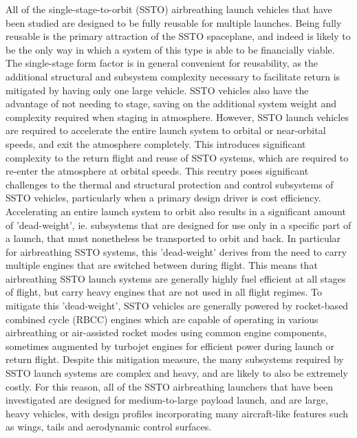 All of the single-stage-to-orbit (SSTO) airbreathing launch vehicles that have been studied are designed to be fully reusable for multiple launches. Being fully reusable is the primary attraction of the SSTO spaceplane, and indeed is likely to be the only way in which a system of this type is able to be financially viable. 
The single-stage form factor is in general convenient for reusability, as the additional structural and subsystem complexity necessary to facilitate return is mitigated by having only one large vehicle. SSTO vehicles also have the advantage of not needing to stage, saving on the additional system weight and complexity required when staging in atmosphere. 
However, SSTO launch vehicles are required to accelerate the entire launch system to orbital or near-orbital speeds, and exit the atmosphere completely. This introduces significant complexity to the return flight and reuse of SSTO systems, which are required to re-enter the atmosphere at orbital speeds\cite{NASP}. This reentry poses significant challenges to the thermal and structural protection and control subsystems of SSTO vehicles, particularly when a primary design driver is cost efficiency.
 Accelerating an entire launch system to orbit also results in a significant amount of 'dead-weight', ie. subsystems that are designed for use only in a specific part of a launch, that must nonetheless be transported to orbit and back. In particular for airbreathing SSTO systems, this 'dead-weight' derives from the need to carry multiple engines that are switched between during flight. This means that airbreathing SSTO launch systems are generally highly fuel efficient at all stages of flight, but carry heavy engines that are not used in all flight regimes. 
To mitigate this 'dead-weight', SSTO vehicles are generally powered by rocket-based combined cycle (RBCC) engines which are capable of operating in various airbreathing or air-assisted rocket modes using common engine components, sometimes augmented by turbojet engines for efficient power during launch or return flight. Despite this mitigation measure, the many subsystems required by SSTO launch systems are complex and heavy, and are likely to also be extremely costly.
For this reason, all of the SSTO airbreathing launchers that have been investigated are designed for medium-to-large payload launch, and are large, heavy vehicles, with design profiles incorporating many aircraft-like features such as wings, tails and aerodynamic control surfaces. 

